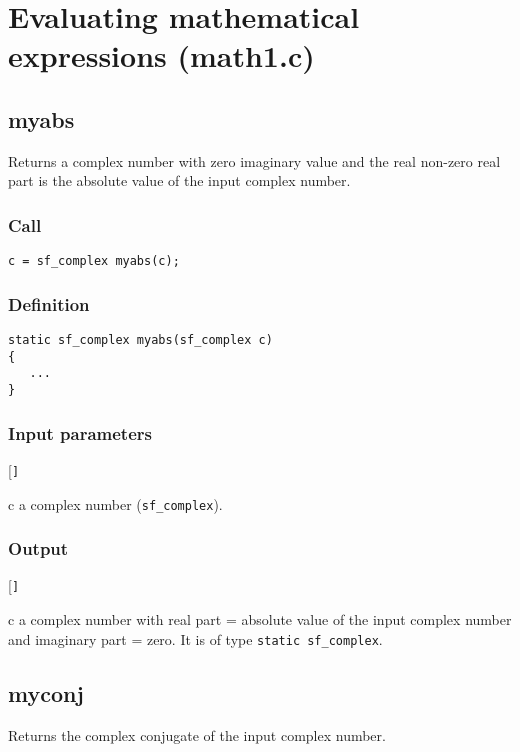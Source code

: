 \section{Evaluating mathematical expressions (math1.c)}




\subsection{{myabs}}
Returns a complex number with zero imaginary value and the real non-zero real part is the absolute value of the input complex number.

\subsubsection*{Call}
\begin{verbatim}c = sf_complex myabs(c);\end{verbatim}

\subsubsection*{Definition}
\begin{verbatim}
static sf_complex myabs(sf_complex c)
{
   ...
}
\end{verbatim}

\subsubsection*{Input parameters}
\begin{desclist}{\tt }{\quad}[\tt ]
   \setlength\itemsep{0pt}
   \item[c] a complex number (\texttt{sf\_complex}).  
\end{desclist}

\subsubsection*{Output}
\begin{desclist}{\tt }{\quad}[\tt ]
   \setlength\itemsep{0pt}
   \item[c] a complex number with real part = absolute value of the input complex number and imaginary part = zero. It is of type \texttt{static sf\_complex}.
\end{desclist}




\subsection{{myconj}}
Returns the complex conjugate of the input complex number.

